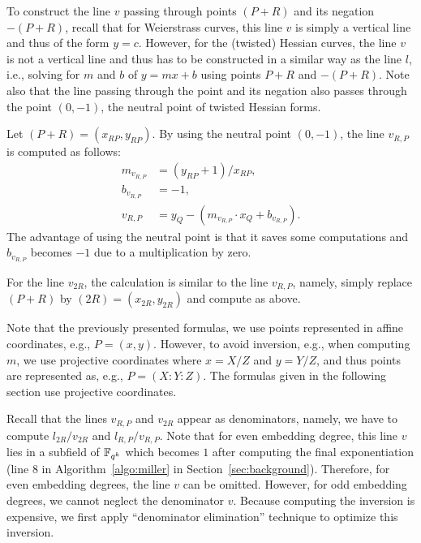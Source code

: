 To construct the line $v$ passing through points $(P+R)$ and its negation $-(P+R)$,
recall that for Weierstrass curves,
this line $v$ is simply a vertical line
and thus of the form $y = c$.
However, for the (twisted) Hessian curves, the line $v$ is not a vertical line
and thus has to be constructed in a similar way as the line $l$,
i.e., solving for $m$ and $b$ of $y = mx + b$ using points $P+R$ and $-(P+R)$.
Note also that the line passing through the point and its negation also passes through
the point $(0,-1)$, the neutral point of twisted Hessian forms.

Let $(P+R) = (x_{RP},y_{RP})$.
By using the neutral point $(0,-1)$,
the line $v_{R,P}$ is computed as follows:
\begin{align*}
m_{v_{R,P}} &= (y_{RP} + 1) / x_{RP},	\\
b_{v_{R,P}} &= -1,			\\
v_{R,P} &= y_Q - (m_{v_{R,P}} \cdot x_Q + b_{v_{R,P}}).
\end{align*}
The advantage of using the neutral point is that
it saves some computations and $b_{v_{R,P}}$ becomes $-1$
due to a multiplication by zero.

For the line $v_{2R}$,
the calculation is similar to the line $v_{R,P}$,
namely,
simply replace $(P+R)$ by $(2R) = (x_{2R}, y_{2R})$
and compute as above.

Note that the previously presented formulas,
we use points represented in affine coordinates,
e.g., $P = (x,y)$.
However, to avoid inversion, e.g., when computing $m$,
we use projective coordinates where
$x = X/Z$ and $y = Y/Z$,
and thus points are represented as, e.g., $P = (X : Y : Z)$.
The formulas given in the following section use projective coordinates.

Recall that the lines $v_{R,P}$ and $v_{2R}$ appear as denominators,
namely, we have to compute $l_{2R}/v_{2R}$ and $l_{R,P}/v_{R,P}$.
Note that for even embedding degree,
this line $v$ lies in a subfield of $\mathbb{F}_{q^k}$
which becomes $1$ after computing the final exponentiation
({line 8} in Algorithm~\ref{algo:miller} in Section~\ref{sec:background}).
Therefore, for even embedding degrees, the line $v$ can be omitted.
However, for odd embedding degrees, we cannot neglect the denominator $v$.
Because computing the inversion is expensive,
we first apply ``denominator elimination'' technique to optimize this inversion.


